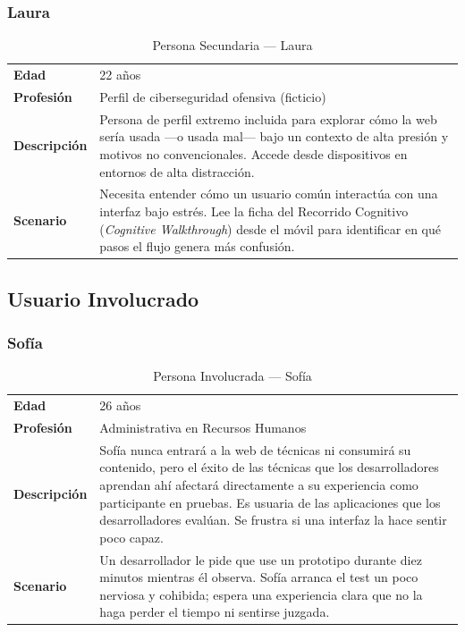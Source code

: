 \documentclass[12pt, a4paper]{report}
\begin{document}
\subsubsection{Laura}

\begin{table}[H]
\centering
\begin{tabularx}{\linewidth}{lX}
\toprule
\textbf{Edad} & 22 años \\
\textbf{Profesión} & Perfil de ciberseguridad ofensiva (ficticio) \\
\midrule
\textbf{Descripción} &
Persona de perfil extremo incluida para explorar cómo la web sería usada —o usada mal— bajo
un contexto de alta presión y motivos no convencionales. Accede desde dispositivos en entornos
de alta distracción. \\[4pt]
\textbf{Scenario} &
Necesita entender cómo un usuario común interactúa con una interfaz bajo estrés. Lee la ficha
del Recorrido Cognitivo (\textit{Cognitive Walkthrough}) desde el móvil para identificar en qué pasos
el flujo genera más confusión. \\
\bottomrule
\end{tabularx}
\caption{Persona Secundaria — Laura}
\end{table}

\subsection{Usuario Involucrado}

\subsubsection{Sofía}

\begin{table}[H]
\centering
\begin{tabularx}{\linewidth}{lX}
\toprule
\textbf{Edad} & 26 años \\
\textbf{Profesión} & Administrativa en Recursos Humanos \\
\midrule
\textbf{Descripción} &
Sofía nunca entrará a la web de técnicas ni consumirá su contenido, pero el éxito de las técnicas
que los desarrolladores aprendan ahí afectará directamente a su experiencia como participante en
pruebas. Es usuaria de las aplicaciones que los desarrolladores evalúan. Se frustra si una interfaz
la hace sentir poco capaz. \\[4pt]
\textbf{Scenario} &
Un desarrollador le pide que use un prototipo durante diez minutos mientras él observa. Sofía
arranca el test un poco nerviosa y cohibida; espera una experiencia clara que no la haga perder
el tiempo ni sentirse juzgada. \\
\bottomrule
\end{tabularx}
\caption{Persona Involucrada — Sofía}
\end{table}
\end{document}
